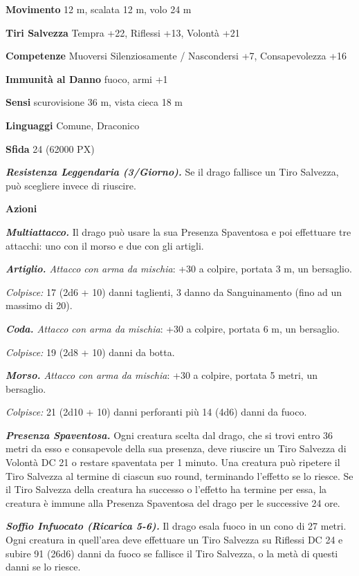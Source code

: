 \begin{multicols}{2}
\textbf{Movimento} 12 m, scalata 12 m, volo 24 m

\textbf{Tiri Salvezza} Tempra +22, Riflessi +13, Volontà +21

\textbf{Competenze} Muoversi Silenziosamente / Nascondersi +7, Consapevolezza +16

\textbf{Immunità al Danno} fuoco, armi +1

\textbf{Sensi} scurovisione 36 m, vista cieca 18 m

\textbf{Linguaggi} Comune, Draconico

\textbf{Sfida} 24 (62000 PX)

\textit{\textbf{Resistenza Leggendaria (3/Giorno).}} Se il drago fallisce un Tiro Salvezza, può scegliere invece di riuscire.

\textbf{Azioni}

\textit{\textbf{Multiattacco.}} Il drago può usare la sua Presenza Spaventosa e poi effettuare tre attacchi: uno con il morso e due con gli artigli.

\textit{\textbf{Artiglio.} Attacco con arma da mischia}: +30 a colpire, portata 3 m, un bersaglio.

\textit{Colpisce:} 17 (2d6 + 10) danni taglienti, 3 danno da Sanguinamento (fino ad un massimo di 20).

\textit{\textbf{Coda.} Attacco con arma da mischia}: +30 a colpire, portata 6 m, un bersaglio.

\textit{Colpisce:} 19 (2d8 + 10) danni da botta.

\textit{\textbf{Morso.} Attacco con arma da mischia}: +30 a colpire, portata 5 metri, un bersaglio.

\textit{Colpisce:} 21 (2d10 + 10) danni perforanti più 14 (4d6) danni da fuoco.

\textit{\textbf{Presenza Spaventosa.}} Ogni creatura scelta dal drago, che si trovi entro 36 metri da esso e consapevole della sua presenza, deve riuscire un Tiro Salvezza di Volontà DC 21 o restare spaventata per 1 minuto. Una creatura può ripetere il Tiro Salvezza al termine di ciascun suo round, terminando l'effetto se lo riesce. Se il Tiro Salvezza della creatura ha successo o l'effetto ha termine per essa, la creatura è immune alla Presenza Spaventosa del drago per le successive 24 ore.

\textit{\textbf{Soffio Infuocato (Ricarica 5-6).}} Il drago esala fuoco in un cono di 27 metri. Ogni creatura in quell'area deve effettuare un Tiro Salvezza su Riflessi DC 24 e subire 91 (26d6) danni da fuoco se fallisce il Tiro Salvezza, o la metà di questi danni se lo riesce.


\end{multicols}
